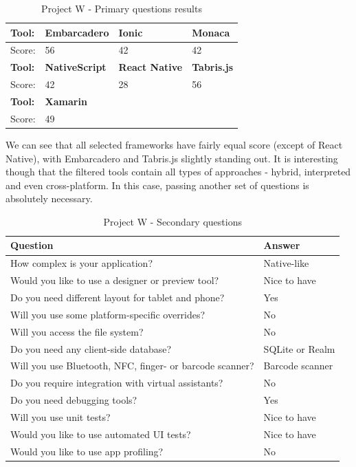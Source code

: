 \documentclass[english,master,public,dept460,male,cpdeclaration,oneside]{diploma}
\begin{document}
\begin{table}[!h]
	\centering
	\caption{Project W - Primary questions results}
	\label{table:wResults1}
	\begin{tabular}{p{4cm} | p{3cm} | p{3cm} | p{3cm}}
		\toprule		
		\textbf{Tool:} & \textbf{Embarcadero} & \textbf{Ionic} & \textbf{Monaca} \\ 
		\midrule
		Score: & 56 & 42 & 42 \\ 
		\midrule
		\textbf{Tool:} & \textbf{NativeScript} & \textbf{React Native} & \textbf{Tabris.js} \\
		\midrule
		Score: & 42 & 28 & 56 \\
		\midrule
		\textbf{Tool:}& \textbf{Xamarin} & & \\	
		\midrule
		Score: & 49 & & \\	
		\midrule
	\end{tabular}
\end{table}

We can see that all selected frameworks have fairly equal score (except of React Native), with Embarcadero and Tabris.js slightly standing out. It is interesting though that the filtered tools contain all types of approaches - hybrid, interpreted and even cross-platform. In this case, passing another set of questions is absolutely necessary.

\begin{table}[!h]
	\centering
	\caption{Project W - Secondary questions}
	\label{table:wSecondary}
	\begin{tabular}{p{7.5cm} | p{5cm}}
		\toprule		
		\textbf{Question} &	\textbf{Answer} \\
		\midrule
		How complex is your application? & Native-like \\
		Would you like to use a designer or preview tool? & Nice to have \\
		Do you need different layout for tablet and phone? & Yes \\
		Will you use some platform-specific overrides? & No \\
		Will you access the file system? & No \\
		Do you need any client-side database? & SQLite or Realm \\
		Will you use Bluetooth, NFC, finger- or barcode scanner? & Barcode scanner \\
		Do you require integration with virtual assistants? & No \\
		Do you need debugging tools? & Yes \\
		Will you use unit tests? & Nice to have \\
		Would you like to use automated UI tests? & Nice to have \\
		Would you like to use app profiling? & No \\		
		\midrule
	\end{tabular}
\end{table}
\end{document}
